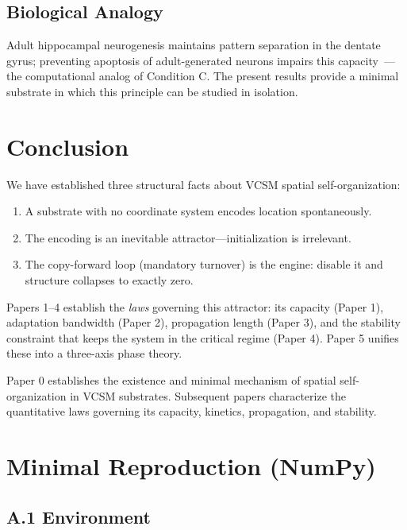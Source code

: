 \documentclass[11pt,twocolumn]{article}
\begin{document}
\subsection{Biological Analogy}

Adult hippocampal neurogenesis maintains pattern separation in the dentate gyrus;
preventing apoptosis of adult-generated neurons impairs this capacity~\cite{kempermann2015}---the
computational analog of Condition C. The present results provide a minimal substrate
in which this principle can be studied in isolation.

\section{Conclusion}

We have established three structural facts about VCSM spatial self-organization:

\begin{enumerate}
  \item A substrate with no coordinate system encodes location spontaneously.
  \item The encoding is an inevitable attractor---initialization is irrelevant.
  \item The copy-forward loop (mandatory turnover) is the engine: disable it
        and structure collapses to exactly zero.
\end{enumerate}

Papers 1--4 establish the \emph{laws} governing this attractor: its capacity
(Paper 1), adaptation bandwidth (Paper 2), propagation length (Paper 3), and
the stability constraint that keeps the system in the critical regime (Paper 4).
Paper 5 unifies these into a three-axis phase theory.

Paper 0 establishes the existence and minimal mechanism of spatial
self-organization in VCSM substrates. Subsequent papers characterize the
quantitative laws governing its capacity, kinetics, propagation, and stability.

\appendix
\section{Minimal Reproduction (NumPy)}
\label{app:repro}

\subsection*{A.1 Environment}
\end{document}
